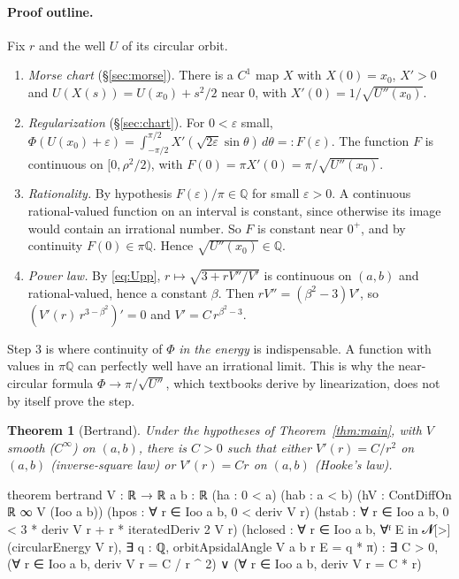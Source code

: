 \documentclass[11pt]{article}
\newtheorem{theorem}{Theorem}
\theoremstyle{remark}
\begin{document}
\paragraph{Proof outline.} Fix $r$ and the well $U$ of its circular orbit.
\begin{enumerate}
  \item \emph{Morse chart} (\S\ref{sec:morse}). There is a $C^1$ map $X$ with $X(0)=x_0$, $X'>0$
  and $U(X(s))=U(x_0)+s^2/2$ near $0$, with $X'(0)=1/\sqrt{U''(x_0)}$.
  \item \emph{Regularization} (\S\ref{sec:chart}). For $0<\varepsilon$ small,
  $\Phi(U(x_0)+\varepsilon)=\int_{-\pi/2}^{\pi/2}X'(\sqrt{2\varepsilon}\sin\theta)\,d\theta=:F(\varepsilon)$.
  The function $F$ is continuous on $[0,\rho^2/2)$, with $F(0)=\pi X'(0)=\pi/\sqrt{U''(x_0)}$.
  \item \emph{Rationality.} By hypothesis $F(\varepsilon)/\pi\in\mathbb{Q}$ for small
  $\varepsilon>0$. A continuous rational-valued function on an interval is constant, since
  otherwise its image would contain an irrational number. So $F$ is constant near $0^+$, and by
  continuity $F(0)\in\pi\mathbb{Q}$. Hence $\sqrt{U''(x_0)}\in\mathbb{Q}$.
  \item \emph{Power law.} By \eqref{eq:Upp}, $r\mapsto\sqrt{3+rV''/V'}$ is continuous on $(a,b)$
  and rational-valued, hence a constant $\beta$. Then $rV''=(\beta^2-3)V'$, so
  $(V'(r)\,r^{3-\beta^2})'=0$ and $V'=C\,r^{\beta^2-3}$.
\end{enumerate}

Step 3 is where continuity of $\Phi$ \emph{in the energy} is indispensable. A function with values
in $\pi\mathbb{Q}$ can perfectly well have an irrational limit. This is why the near-circular
formula $\Phi\to\pi/\sqrt{U''}$, which textbooks derive by linearization, does not by itself
prove the step.

\begin{theorem}[Bertrand]\label{thm:bertrand}
Under the hypotheses of Theorem~\ref{thm:main}, with $V$ smooth ($C^\infty$) on $(a,b)$, there is
$C>0$ such that either $V'(r)=C/r^2$ on $(a,b)$ (inverse-square law) or $V'(r)=Cr$ on $(a,b)$
(Hooke's law).
\end{theorem}

\begin{lean}
theorem bertrand {V : ℝ → ℝ} {a b : ℝ} (ha : 0 < a) (hab : a < b)
    (hV : ContDiffOn ℝ ∞ V (Ioo a b))
    (hpos : ∀ r ∈ Ioo a b, 0 < deriv V r)
    (hstab : ∀ r ∈ Ioo a b, 0 < 3 * deriv V r + r * iteratedDeriv 2 V r)
    (hclosed : ∀ r ∈ Ioo a b, ∀ᶠ E in 𝓝[>] (circularEnergy V r),
      ∃ q : ℚ, orbitApsidalAngle V a b r E = q * π) :
    ∃ C > 0, (∀ r ∈ Ioo a b, deriv V r = C / r ^ 2) ∨ (∀ r ∈ Ioo a b, deriv V r = C * r)
\end{lean}
\end{document}
